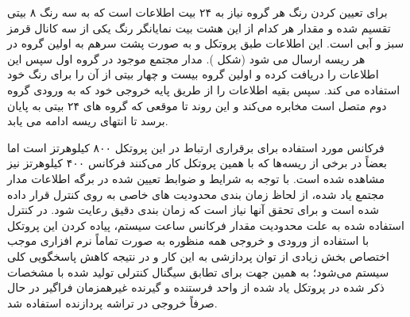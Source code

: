 برای تعیین کردن رنگ هر گروه نیاز به ۲۴ بیت اطلاعات است که به سه رنگ ۸ بیتی تقسیم شده و مقدار هر کدام از این هشت بیت نمایانگر رنگ یکی از سه کانال قرمز سبز و آبی است. این اطلاعات طبق پروتکل و به صورت پشت سرهم به اولین گروه در هر ریسه ارسال می شود (شکل ). مدار مجتمع موجود در گروه اول سپس این اطلاعات را دریافت کرده و اولین گروه بیست و چهار بیتی از آن را برای رنگ خود استفاده می کند. سپس بقیه اطلاعات را از طریق پایه خروجی خود که به ورودی گروه دوم متصل است مخابره می‌کند و این روند تا موقعی که گروه های ۲۴ بیتی به پایان برسد تا انتهای ریسه ادامه می یابد.

فرکانس مورد استفاده برای برقراری ارتباط در این پروتکل ۸۰۰ کیلوهرتز است اما بعضاً در برخی از ریسه‌ها که با همین پروتکل کار می‌کنند فرکانس ۴۰۰ کیلوهرتز نیز مشاهده شده است. با توجه به شرایط و ضوابط تعیین شده در برگه اطلاعات مدار مجتمع یاد شده، از لحاظ زمان بندی محدودیت های خاصی به روی کنترل قرار داده شده است و برای تحقق آنها نیاز است که زمان بندی دقیق رعایت شود. در کنترل استفاده شده به علت محدودیت مقدار فرکانس ساعت سیستم، پیاده کردن این پروتکل با استفاده از ورودی و خروجی همه منظوره به صورت تماماً نرم افزاری موجب اختصاص بخش زیادی از توان پردازشی به این کار و در نتیجه کاهش پاسخگویی کلی سیستم می‌شود؛ به همین جهت برای تطابق سیگنال کنترلی تولید شده با مشخصات ذکر شده در پروتکل یاد شده از واحد فرستنده و گیرنده غیرهمزمان فراگیر در حال صرفاً خروجی در تراشه پردازنده استفاده شد.

